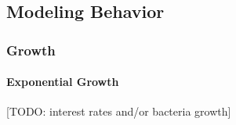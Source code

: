 


%






\subsection{Modeling Behavior}

\subsubsection{Growth}

\paragraph{Exponential Growth} [TODO: interest rates and/or bacteria growth]

